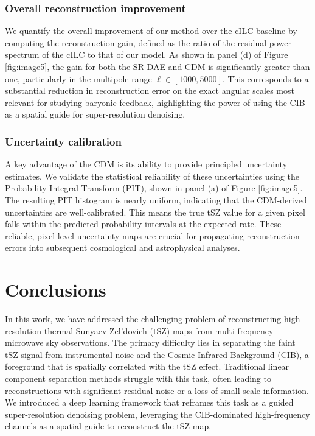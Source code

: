 \documentclass[]{article}
\begin{document}
\subsubsection{Overall reconstruction improvement}
We quantify the overall improvement of our method over the cILC baseline by computing the reconstruction gain, defined as the ratio of the residual power spectrum of the cILC to that of our model. As shown in panel (d) of Figure \ref{fig:image5}, the gain for both the SR-DAE and CDM is significantly greater than one, particularly in the multipole range $\ell \in [1000, 5000]$. This corresponds to a substantial reduction in reconstruction error on the exact angular scales most relevant for studying baryonic feedback, highlighting the power of using the CIB as a spatial guide for super-resolution denoising.

\subsubsection{Uncertainty calibration}
A key advantage of the CDM is its ability to provide principled uncertainty estimates. We validate the statistical reliability of these uncertainties using the Probability Integral Transform (PIT), shown in panel (a) of Figure \ref{fig:image5}. The resulting PIT histogram is nearly uniform, indicating that the CDM-derived uncertainties are well-calibrated. This means the true tSZ value for a given pixel falls within the predicted probability intervals at the expected rate. These reliable, pixel-level uncertainty maps are crucial for propagating reconstruction errors into subsequent cosmological and astrophysical analyses.

\section{Conclusions}
\label{sec:conclusions}


In this work, we have addressed the challenging problem of reconstructing high-resolution thermal Sunyaev-Zel'dovich (tSZ) maps from multi-frequency microwave sky observations. The primary difficulty lies in separating the faint tSZ signal from instrumental noise and the Cosmic Infrared Background (CIB), a foreground that is spatially correlated with the tSZ effect. Traditional linear component separation methods struggle with this task, often leading to reconstructions with significant residual noise or a loss of small-scale information. We introduced a deep learning framework that reframes this task as a guided super-resolution denoising problem, leveraging the CIB-dominated high-frequency channels as a spatial guide to reconstruct the tSZ map.
\end{document}
